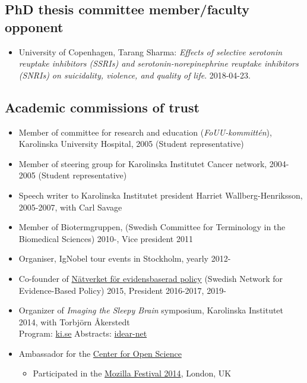 \documentclass[10pt]{article}
\begin{document}
\subsection*{PhD thesis committee member/faculty opponent}
\begin{itemize}[nolistsep]
\item University of Copenhagen, Tarang Sharma: \emph{Effects of selective serotonin reuptake inhibitors (SSRIs) and serotonin-norepinephrine reuptake inhibitors (SNRIs) on suicidality, violence, and quality of life}. 2018-04-23.
\end{itemize}

\subsection*{Academic commissions of trust}
\begin{itemize}[nolistsep]
\item Member of committee for research and education (\emph{FoUU-kommittén}), Karolinska University Hospital, 2005 (Student representative)
\item Member of steering group for Karolinska Institutet Cancer network, 2004-2005 (Student representative)
\item Speech writer to Karolinska Institutet president Harriet Wallberg-Henriksson, 2005-2007, with Carl Savage
\item Member of Biotermgruppen, (Swedish Committee for Terminology in the Biomedical Sciences) 2010-, Vice president 2011
\item Organiser, IgNobel tour events in Stockholm, yearly 2012-
\item Co-founder of \href{http://evidensbaseradpolicy.se/}{Nätverket för evidensbaserad policy} (Swedish Network for Evidence-Based Policy) 2015, President 2016-2017, 2019-
\item Organizer of \emph{Imaging the Sleepy Brain} symposium, Karolinska Institutet 2014, with Torbjörn Åkerstedt\\
Program: \href{http://ki.se/en/cns/calendar/imaging-the-sleepy-brain}{ki.se}
Abstracts: \href{http://www.idear-net.net/ssc/?wpdmpro=abstracts-imaging-the-sleepy-brain}{idear-net}
\item Ambassador for the \href{https://cos.io/}{Center for Open Science}
	\begin{itemize}[nolistsep]
	\item Participated in the \href{http://2014.mozillafestival.org/}{Mozilla Festival 2014}, London, UK
	\end{itemize}

\end{itemize}
\end{document}
